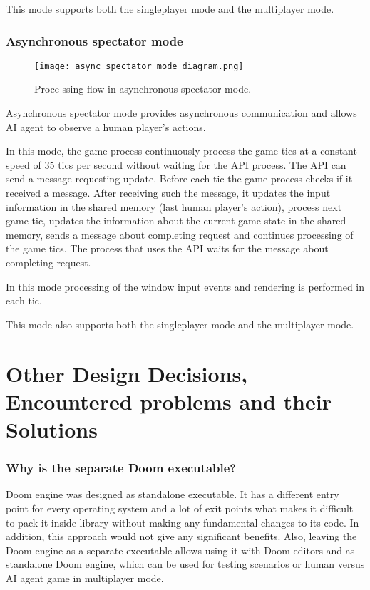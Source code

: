 	    This mode supports both the singleplayer mode and the multiplayer mode.

    \subsubsection{Asynchronous spectator mode}\label{sec:architecture_async_spectator_mode}

	    \begin{figure}
			    \centering
			    \texttt{[image: async\_spectator\_mode\_diagram.png]}
			    \caption{Proce      ssing flow in asynchronous spectator mode.}\label{fig:async_spectator_mode_diagram}
	    \end{figure}
	    
	    Asynchronous spectator mode provides asynchronous communication and allows AI agent to observe a human player's actions. 
	    
	    In this mode, the game process continuously process the game tics at a constant speed of 35 tics per second without waiting for the API process. The API can send a message requesting update. Before each tic the game process checks if it received a message. After receiving such the message, it updates the input information in the shared memory (last human player's action), process next game tic, updates the information about the current game state in the shared memory, sends a message about completing request and continues processing of the game tics. The process that uses the API waits for the message about completing request.

        In this mode processing of the window input events and rendering is performed in each tic.
        
        This mode also supports both the singleplayer mode and the multiplayer mode.

\section{Other Design Decisions, Encountered problems and their Solutions}\label{sec:architecture_solutions}

\subsubsection{Why is the separate Doom executable?}

Doom engine was designed as standalone executable. It has a different entry point for every operating system and a lot of exit points what makes it difficult to pack it inside library without making any fundamental changes to its code. In addition, this approach would not give any significant benefits. Also, leaving the Doom engine as a separate executable allows using it with Doom editors and as standalone Doom engine, which can be used for testing scenarios or human versus AI agent game in multiplayer mode.

